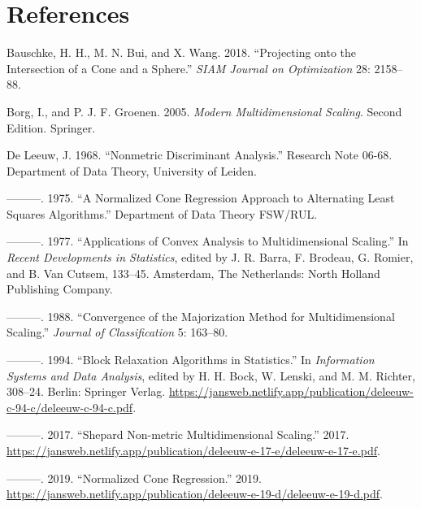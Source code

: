 \documentclass[
  12pt,
  letterpaper,
  DIV=11,
  numbers=noendperiod]{scrartcl}
\newlength{\cslhangindent}
\newenvironment{CSLReferences}[2] %
 {\begin{list}{}{%
  \setlength{\itemindent}{0pt}
  \setlength{\leftmargin}{0pt}
  \setlength{\parsep}{0pt}
  \ifodd #1
   \setlength{\leftmargin}{\cslhangindent}
   \setlength{\itemindent}{-1\cslhangindent}
  \fi
  \setlength{\itemsep}{#2\baselineskip}}}
 {\end{list}}
\newcommand{\sectionbreak}{\clearpage}
\theoremstyle{plain}
\theoremstyle{remark}
\begin{document}
\sectionbreak

\section*{References}\label{references}

\label{refs}
\begin{CSLReferences}{1}{0}
Bauschke, H. H., M. N. Bui, and X. Wang. 2018. {``{Projecting onto the
Intersection of a Cone and a Sphere}.''} \emph{SIAM Journal on
Optimization} 28: 2158--88.

Borg, I., and P. J. F. Groenen. 2005. \emph{Modern Multidimensional
Scaling}. Second Edition. Springer.

De Leeuw, J. 1968. {``Nonmetric Discriminant Analysis.''} Research Note
06-68. Department of Data Theory, University of Leiden.

---------. 1975. {``{A Normalized Cone Regression Approach to
Alternating Least Squares Algorithms}.''} Department of Data Theory
FSW/RUL.

---------. 1977. {``Applications of Convex Analysis to Multidimensional
Scaling.''} In \emph{Recent Developments in Statistics}, edited by J. R.
Barra, F. Brodeau, G. Romier, and B. Van Cutsem, 133--45. Amsterdam, The
Netherlands: North Holland Publishing Company.

---------. 1988. {``Convergence of the Majorization Method for
Multidimensional Scaling.''} \emph{Journal of Classification} 5:
163--80.

---------. 1994. {``{Block Relaxation Algorithms in Statistics}.''} In
\emph{Information Systems and Data Analysis}, edited by H. H. Bock, W.
Lenski, and M. M. Richter, 308--24. Berlin: Springer Verlag.
\url{https://jansweb.netlify.app/publication/deleeuw-c-94-c/deleeuw-c-94-c.pdf}.

---------. 2017. {``{Shepard Non-metric Multidimensional Scaling}.''}
2017.
\url{https://jansweb.netlify.app/publication/deleeuw-e-17-e/deleeuw-e-17-e.pdf}.

---------. 2019. {``Normalized Cone Regression.''} 2019.
\url{https://jansweb.netlify.app/publication/deleeuw-e-19-d/deleeuw-e-19-d.pdf}.


\end{CSLReferences}
\end{document}
